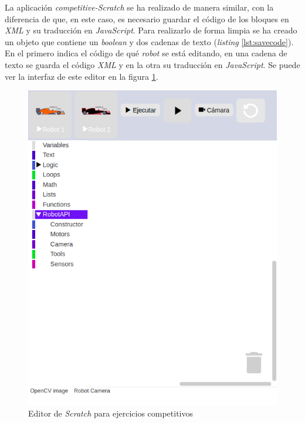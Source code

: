 La aplicación \textit{competitive-Scratch} se ha realizado de  manera similar, con la diferencia de que, en este caso, es necesario guardar el código de los bloques en \textit{XML} y su traducción en \textit{JavaScript}. Para realizarlo de forma limpia se ha creado un objeto que contiene un \textit{boolean} y dos cadenas de texto (\textit{listing} \ref{lst:savecode}). En el primero indica el código de qué \textit{robot} se está editando, en una cadena de texto se guarda el código \textit{XML} y en la otra su traducción en \textit{JavaScript}. Se puede ver la interfaz de este editor en la figura \ref{fig:scratch_competitivo}.
    \begin{figure}[H]
        \centering            
        \includegraphics[scale=0.30]{img/competitivoEditorScratch.png}
        \caption{Editor de \textit{Scratch} para ejercicios competitivos}
        \label{fig:scratch_competitivo}
    \end{figure}

